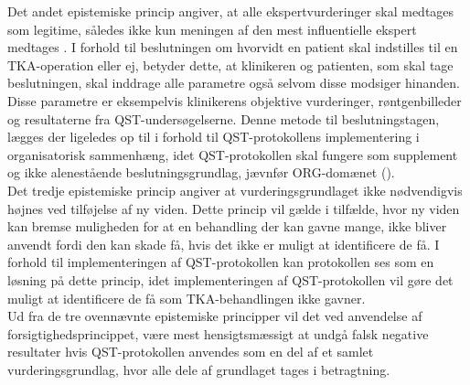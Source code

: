 Det andet epistemiske princip angiver, at alle ekspertvurderinger skal medtages som legitime, således ikke kun meningen af den mest influentielle ekspert medtages \citep{Peterson2007}. I forhold til beslutningen om hvorvidt en patient skal indstilles til en TKA-operation eller ej, betyder dette, at klinikeren og patienten, som skal tage beslutningen, skal inddrage alle parametre også selvom disse modsiger hinanden. Disse parametre er eksempelvis klinikerens objektive vurderinger, røntgenbilleder og resultaterne fra QST-undersøgelserne. Denne metode til beslutningstagen, lægges der ligeledes op til i forhold til QST-protokollens implementering i organisatorisk sammenhæng, idet QST-protokollen skal fungere som supplement og ikke alenestående beslutningsgrundlag, jævnfør ORG-domænet (). \\
Det tredje epistemiske princip angiver at vurderingsgrundlaget ikke nødvendigvis højnes ved tilføjelse af ny viden. Dette princip vil gælde i tilfælde, hvor ny viden kan bremse muligheden for at en behandling der kan gavne mange, ikke bliver anvendt fordi den kan skade få, hvis det ikke er muligt at identificere de få. \citep{Peterson2007} I forhold til implementeringen af QST-protokollen kan protokollen ses som en løsning på dette princip, idet implementeringen af QST-protokollen vil gøre det muligt at identificere de få som TKA-behandlingen ikke gavner. \\
Ud fra de tre ovennævnte epistemiske principper vil det ved anvendelse af forsigtighedsprincippet, være mest hensigtsmæssigt at undgå falsk negative resultater hvis QST-protokollen anvendes som en del af et samlet vurderingsgrundlag, hvor alle dele af grundlaget tages i betragtning. \\

